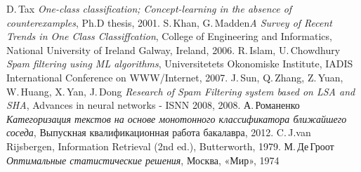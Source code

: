 \begin{thebibliography}{99}

 D.\,Tax  \textit{One-class classification; Concept-learning in the absence of
counterexamples}, Ph.D thesis, 2001.
 S.\,Khan, G.\,Madden\textit{A Survey of Recent Trends in One Class
Classiffcation}, College of Engineering and Informatics, National University of Ireland Galway,
Ireland, 2006.
 R.\,Islam, U.\,Chowdhury \textit{Spam filtering using ML algorithms}, Universitetets Okonomiske Institute, IADIS International Conference on WWW/Internet, 2007.
 J.\,Sun, Q.\,Zhang, Z.\,Yuan, W.\,Huang, X.\,Yan, J.\,Dong \textit{Research of Spam Filtering system based on LSA and SHA}, Advances in neural networks - ISNN 2008, 2008.
 А.\,Романенко  \textit{Категоризация текстов на основе монотонного
классификатора ближайшего соседа}, Выпускная квалификационная работа бакалавра, 2012.
 C.\,J.van\,Rijsbergen, Information Retrieval (2nd ed.), Butterworth, 1979.
М.\,Де\,Гроот \textit{Оптимальные статистические решения}, Москва, «Мир», 1974

\end{thebibliography}
